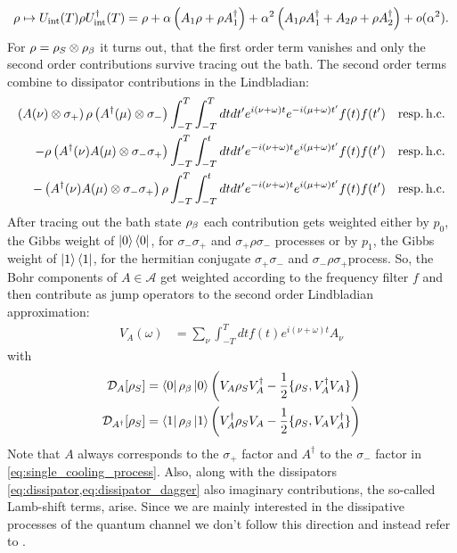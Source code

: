 \documentclass[12pt,a4paper]{article}
\begin{document}
\begin{align} 
\rho 
\mapsto U_{\rm int}(T) \rho U_{\rm int}^{\dagger}(T)
= \rho 
+ \alpha \left(A_1 \rho + \rho A_1^{\dagger}\right)
+ \alpha^2 \left(A_1\rho A_1^{\dagger} + A_2 \rho + \rho A_2^{\dagger}\right) 
+ o(\alpha^2).
\end{align}
For $\rho = \rho_S\otimes \rho_{\rm \beta}$ it turns out, that the first order term vanishes and only the second order contributions survive tracing out the bath. The second order terms combine to dissipator contributions in the Lindbladian:
\begin{align}
\left(A(\nu)\otimes \sigma_+\right)\rho \left(A^{\dagger}(\mu)\otimes\sigma_-\right)&\int_{-T}^T\int_{-T}^Tdt dt' e^{i(\nu+\omega)t}e^{-i(\mu+\omega)t'} f(t)f(t') & {\rm resp. }\, \textrm{h.c.}\nonumber\\
 -\rho \left(A^{\dagger}(\nu)A(\mu)\otimes \sigma_-\sigma_+\right)&\int_{-T}^T\int_{-T}^t dt dt'e^{-i(\nu+\omega)t}e^{i(\mu+\omega)t'}f(t)f(t') & {\rm resp. }\, \textrm{h.c.}\\
 -\left(A^{\dagger}(\nu)A(\mu)\otimes \sigma_-\sigma_+\right)\rho &\int_{-T}^T \int_{-T}^t dt dt'e^{-i(\nu+\omega)t}e^{i(\mu+\omega)t'}f(t)f(t')& {\rm resp. }\, \textrm{h.c.}\nonumber
\end{align}
After tracing out the bath state $\rho_{\rm \beta}$ each contribution gets weighted either by $p_0$, the Gibbs weight of $\ket{0}\bra{0}$, for $\sigma_-\sigma_+$ and $\sigma_+\rho \sigma_-$ processes or by $p_1$, the Gibbs weight of $\ket{1}\bra{1}$, for the hermitian conjugate $\sigma_+\sigma_-$ and $\sigma_-\rho \sigma_+$process.
%
So, the Bohr components of $A\in \mathcal{A}$ get weighted according to the frequency filter $f$ and then contribute as jump operators to the second order Lindbladian approximation:
\begin{align}
V_A(\omega)  &=\sum_{\nu}\int_{-T}^Tdt f(t) e^{i(\nu+\omega)t} A_{\nu} 
\end{align}
with
\begin{align}\label{eq:dissipator}
\mathcal{D}_{A}[\rho_S] &= \bra{0}\rho_{\rm \beta}\ket{0}\left(V_A \rho_S V_A^{\dagger} - \frac12 \{\rho_S, V_A^{\dagger}V_A\}\right)\\\label{eq:dissipator_dagger}
\mathcal{D}_{A^{\dagger}}[\rho_S] &= \bra{1}\rho_{\rm \beta}\ket{1}\left(V_A^{\dagger} \rho_S V_A - \frac12 \{\rho_S, V_AV_A^{\dagger}\}\right)
\end{align}
Note that $A$ always corresponds to the $\sigma_+$ factor and $A^{\dagger}$ to the $\sigma_-$ factor in  \cref{eq:single_cooling_process}. Also, along with the dissipators \cref{eq:dissipator,eq:dissipator_dagger} also imaginary contributions, the so-called Lamb-shift terms, arise. Since we are mainly interested in the dissipative processes of the quantum channel we don't follow this direction and instead refer to \citet[Appendix C]{ding2025}.
\end{document}
